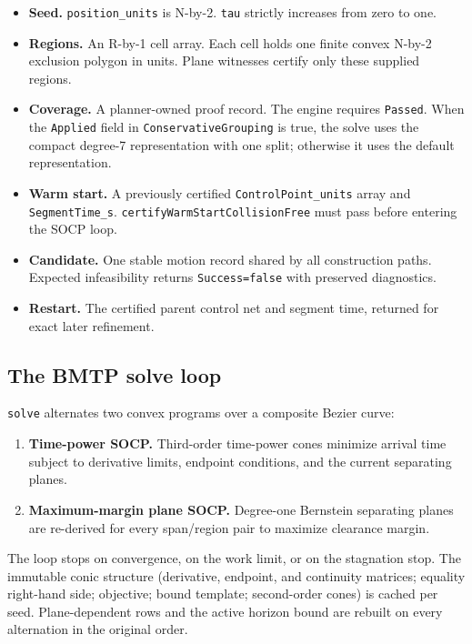 \documentclass[11pt]{article}
\begin{document}
\begin{itemize}
    \item \textbf{Seed.} \texttt{position\_units} is N-by-2. \texttt{tau} strictly increases from zero to
    one.
    \item \textbf{Regions.} An R-by-1 cell array. Each cell holds one finite convex N-by-2
    exclusion polygon in units. Plane witnesses certify only these supplied
    regions.
    \item \textbf{Coverage.} A planner-owned proof record. The engine requires
    \texttt{Passed}. When the \texttt{Applied} field in
    \texttt{ConservativeGrouping} is true, the solve uses the compact
    degree-7 representation with one split; otherwise it uses the default
    representation.
    \item \textbf{Warm start.} A previously certified
    \texttt{ControlPoint\_units} array and \texttt{SegmentTime\_s}.
    \texttt{certifyWarmStart\allowbreak CollisionFree} must pass before entering
    the SOCP loop.
    \item \textbf{Candidate.} One stable motion record shared by all construction paths.
    Expected infeasibility returns \texttt{Success=false} with preserved diagnostics.
    \item \textbf{Restart.} The certified parent control net and segment time, returned for
    exact later refinement.
\end{itemize}

\subsection{The BMTP solve loop}

\texttt{solve} alternates two convex programs over a composite Bezier curve:

\begin{enumerate}
    \item \textbf{Time-power SOCP.} Third-order time-power cones minimize arrival time
    subject to derivative limits, endpoint conditions, and the current
    separating planes.
    \item \textbf{Maximum-margin plane SOCP.} Degree-one Bernstein separating planes are
    re-derived for every span/region pair to maximize clearance margin.
\end{enumerate}

The loop stops on convergence, on the work limit, or on the stagnation
stop. The immutable conic structure (derivative, endpoint, and continuity
matrices; equality right-hand side; objective; bound template; second-order
cones) is cached per seed. Plane-dependent rows and the active horizon bound
are rebuilt on every alternation in the original order.
\end{document}
